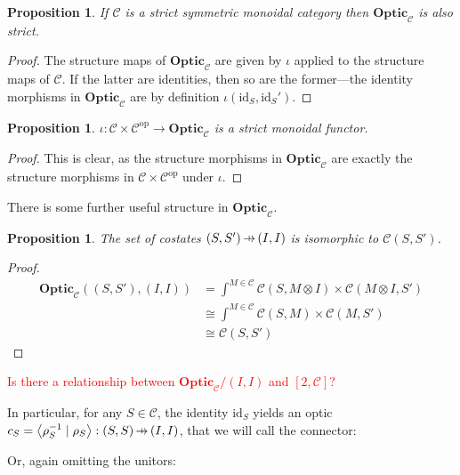 \documentclass[11pt,a4paper]{article}
\theoremstyle{plain}
\newtheorem{proposition}[theorem]{Proposition}
\theoremstyle{definition}
\newcommand{\C}{\mathscr{C}}
\newcommand{\Optic}{\mathbf{Optic}}
\newcommand{\id}{\mathrm{id}}
\newcommand{\op}{\mathrm{op}}
\newcommand{\rep}[2]{{\ensuremath \left\langle #1 \mid #2 \right\rangle}}
\newcommand{\hto}{\ensuremath{\,\mathaccent\shortmid\rightarrow\,}}
\newcommand{\todo}[1]{\textcolor{red}{\small #1}}
\begin{document}
\begin{proposition}
  If $\C$ is a strict symmetric monoidal category then $\Optic_\C$ is also strict.
\end{proposition}
\begin{proof}
  The structure maps of $\Optic_\C$ are given by $\iota$ applied to the structure maps of $\C$. If the latter are identities, then so are the former---the identity morphisms in $\Optic_\C$ are by definition $\iota(\id_S, \id_S')$.
\end{proof}

\begin{proposition}
  $\iota : \C \times \C^\op \to \Optic_\C$ is a strict monoidal functor.
\end{proposition}
\begin{proof}
  This is clear, as the structure morphisms in $\Optic_\C$ are exactly the structure morphisms in $\C \times \C^\op$ under $\iota$.
\end{proof}


There is some further useful structure in $\Optic_\C$.
\begin{proposition}\label{prop-costates}
  The set of costates $(S, S') \hto (I, I)$ is isomorphic to $\C(S, S')$.
\end{proposition}
\begin{proof}
  \begin{align*}
    \Optic_\C((S, S'), (I, I))
    &= \int^{M \in \C} \C(S, M \otimes I) \times \C(M \otimes I, S') \\
    &\cong \int^{M \in \C} \C(S, M) \times \C(M, S') \\
    &\cong \C(S, S')
  \end{align*}
\end{proof}

\todo{Is there a relationship between $\Optic_\C/(I, I)$ and $[2, \C]$?}

In particular, for any $S \in \C$, the identity $\id_S$ yields an optic $c_S = \rep{\rho_S^{-1}}{\rho_S} : (S, S) \hto (I, I)$, that we will call the connector:
\begin{center}
  
\end{center}
Or, again omitting the unitors:
\begin{center}
  
\end{center}
\end{document}
